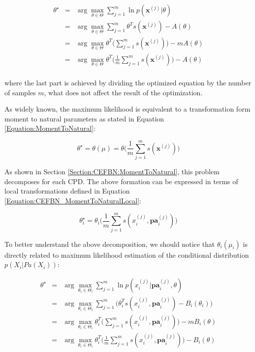\documentclass[11pt, oneside]{article}   	%
\newcommand{\bm}{\mathbf}
\numberwithin{figure}{section}
\numberwithin{equation}{section}
\numberwithin{table}{section}
\theoremstyle{definition}
\begin{document}
\begin{eqnarray*}
\theta^\star  &=& \arg\max_{\theta \in \Theta} \sum_{j=1}^m \ln p(\bm x^{(j)}|\theta) \\
&=& \arg\max_{\theta \in \Theta} \sum_{j=1}^m \theta^Ts(\bm x^{(j)})  - A(\theta) \\
&=& \arg\max_{\theta \in \Theta} \theta^T\Big(\sum_{j=1}^m s(\bm x^{(j)})\Big)  - m A(\theta) \\
&=& \arg\max_{\theta \in \Theta} \theta^T\Big(\frac{1}{m}\sum_{j=1}^m s(\bm x^{(j)})\Big)  - A(\theta) \\
\end{eqnarray*}

\noindent where the last part is achieved by dividing the optimized equation by the number of samples $m$, what does not affect the result of the optimization. 

As widely known, the maximum likelihood is equivalent to a transformation form moment to natural parameters as stated in Equation \ref{Equation:MomentToNatural}: 

$$\theta^\star = \theta (\mu) = \theta\Big(\frac{1}{m}\sum_{j=1}^m s(\bm x^{(j)})\Big)$$

As shown in Section \ref{Section:CEFBN:MomentToNatural}, this problem decomposes for each CPD. The above formation can be expressed in terms of local transformations defined in Equation \ref{Equation:CEFBN_MomentToNaturalLocal}:

$$\theta_i^\star = \theta_i\Big(\frac{1}{m}\sum_{j=1}^m s(x_i^{(j)},\bm{pa}^{(j)}_i)\Big)$$

To better understand the above decomposition, we should notice that $\theta_i(\mu_i)$ is directly related to maximum likelihood estimation of the conditional distribution $p(X_i|Pa(X_i))$:

\begin{eqnarray*}
\theta^\star  &=& \arg\max_{\theta_i \in \Theta_i} \sum_{j=1}^m \ln p(x_i^{(j)}|\bm{pa}^{(j)}_i,\theta) \\
&=& \arg\max_{\theta_i \in \Theta_i} \sum_{j=1}^m \Big(\theta_i^Ts(x_i^{(j)},\bm{pa}^{(j)}_i)  - B_i(\theta_i) \Big)\\
&=& \arg\max_{\theta_i \in \Theta_i} \theta_i^T\Big(\sum_{j=1}^m s(x_i^{(j)},\bm{pa}^{(j)}_i) \Big)  - m B_i(\theta) \\
&=& \arg\max_{\theta_i \in \Theta_i} \theta_i^T\Big(\frac{1}{m}\sum_{j=1}^m s(x_i^{(j)},\bm{pa}^{(j)}_i) \Big)  - B_i(\theta) \\
\end{eqnarray*}
\end{document}
